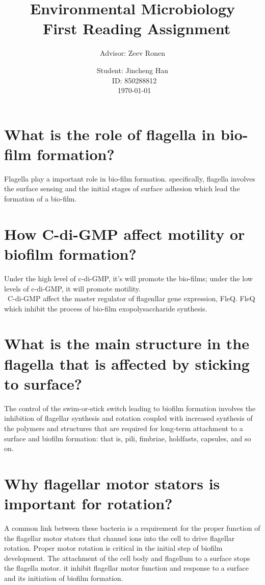 \documentclass[12pt]{article}%
\begin{document}
\title{Environmental Microbiology \\\
First Reading Assignment}
\author{Advisor: Zeev Ronen}
\date{Student: Jincheng Han\\\
ID: 850288812\\\
\today}
\maketitle
\section{What is the role of flagella in bio-film formation?
}
Flagella play a important role in bio-film formation. specifically, flagella involves the surface sensing and the initial stages of surface adhesion which lead the formation of a bio-film. 




\section{How C-di-GMP  affect motility or biofilm formation?
}
Under the high level of c-di-GMP, it's will promote the bio-films; under the low levels of c-di-GMP, it will promote motility. \\\
C-di-GMP affect the master regulator of flagenllar gene expression, FleQ. FleQ which inhibit the process of bio-film exopolysaccharide synthesis.

\section{What is the main structure in the flagella that is affected by sticking to surface?
}
The control of the swim-or-stick switch leading to biofilm formation involves the inhibition of flagellar synthesis and rotation coupled with increased synthesis of the polymers and structures that are required for long-term attachment to a surface and biofilm formation: that is, pili, fimbriae, holdfasts, capsules, and so on.



\section{Why flagellar motor stators is important for rotation?}     
A common link between these bacteria is a requirement for the proper function of the flagellar motor stators that channel ions into the cell to drive flagellar rotation. Proper motor rotation is critical in the initial step of biofilm development. The attachment of the cell body and flagellum to a surface stops the flagella motor. it inhibit flagellar motor function and response to a surface and its initiation of biofilm formation.
\end{document}
